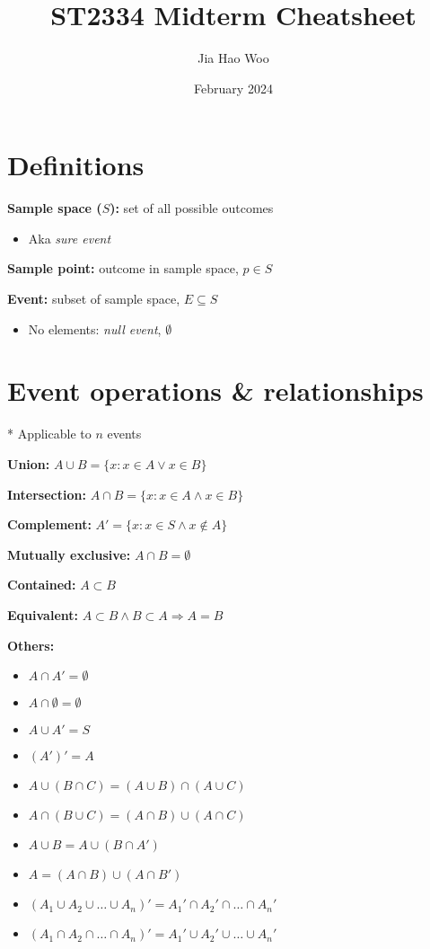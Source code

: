 \documentclass[twocolumn, 8pt]{extarticle}
\title{ST2334 Midterm Cheatsheet}
\author{Jia Hao Woo}
\date{February 2024}
\begin{document}
\section*{Definitions}

\textbf{Sample space ($S$):} set of all possible outcomes

\begin{itemize}
    \item Aka \textit{sure event}
\end{itemize}

\textbf{Sample point:} outcome in sample space, $p \in S$

\textbf{Event:} subset of sample space, $E \subseteq S$

\begin{itemize}
    \item No elements: \textit{null event}, $\emptyset$
\end{itemize}

\section*{Event operations \& relationships}\noindent

* Applicable to $n$ events

\textbf{Union:} $A \cup B = \{x : x \in A \lor x \in B\}$

\textbf{Intersection:} $A \cap B = \{x : x \in A \land x \in B\}$

\textbf{Complement:} $A' = \{x : x \in S \land x \not\in A\}$

\textbf{Mutually exclusive:} $A \cap B = \emptyset$

\textbf{Contained:} $A \subset B$

\textbf{Equivalent:} $A \subset B \land B \subset A \Rightarrow A = B$

\textbf{Others:}

\begin{itemize}
    \item $A \cap A' = \emptyset$
    \item $A \cap \emptyset = \emptyset$
    \item $A \cup A' = S$
    \item $(A')' = A$
    \item $A \cup (B \cap C) = (A \cup B) \cap (A \cup C)$
    \item $A \cap (B \cup C) = (A \cap B) \cup (A \cap C)$
    \item $A \cup B = A \cup (B \cap A')$
    \item $A = (A \cap B) \cup (A \cap B')$
    \item $(A_1 \cup A_2 \cup \ldots \cup A_n)' = A_1' \cap A_2' \cap \ldots \cap A_n'$
    \item $(A_1 \cap A_2 \cap \ldots \cap A_n)' = A_1' \cup A_2' \cup \ldots \cup A_n'$
\end{itemize}
\end{document}
